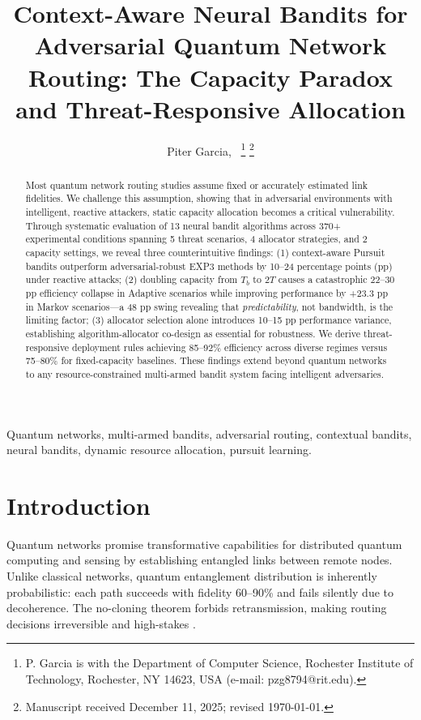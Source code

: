 \documentclass[10pt,twocolumn,journal]{IEEEtran}
\title{Context-Aware Neural Bandits for Adversarial Quantum Network Routing: The Capacity Paradox and Threat-Responsive Allocation}
\author{Piter Garcia,~\IEEEmembership{Student Member, IEEE}
\thanks{P. Garcia is with the Department of Computer Science, Rochester Institute of Technology, Rochester, NY 14623, USA (e-mail: pzg8794@rit.edu).}
\thanks{Manuscript received December 11, 2025; revised \today.}}
\begin{document}
\maketitle

\begin{abstract}

Most quantum network routing studies assume fixed or accurately estimated link fidelities. We challenge this assumption, showing that in adversarial environments with intelligent, reactive attackers, static capacity allocation becomes a critical vulnerability. Through systematic evaluation of 13 neural bandit algorithms across 370+ experimental conditions spanning 5 threat scenarios, 4 allocator strategies, and 2 capacity settings, we reveal three counterintuitive findings: (1) context-aware Pursuit bandits outperform adversarial-robust EXP3 methods by 10--24 percentage points (pp) under reactive attacks; (2) doubling capacity from $T_b$ to $2T$ causes a catastrophic 22--30 pp efficiency collapse in Adaptive scenarios while improving performance by +23.3 pp in Markov scenarios—a 48 pp swing revealing that \textit{predictability}, not bandwidth, is the limiting factor; (3) allocator selection alone introduces 10--15 pp performance variance, establishing algorithm-allocator co-design as essential for robustness. We derive threat-responsive deployment rules achieving 85--92\% efficiency across diverse regimes versus 75--80\% for fixed-capacity baselines. These findings extend beyond quantum networks to any resource-constrained multi-armed bandit system facing intelligent adversaries.

\end{abstract}

\begin{IEEEkeywords}
Quantum networks, multi-armed bandits, adversarial routing, contextual bandits, neural bandits, dynamic resource allocation, pursuit learning.
\end{IEEEkeywords}

\IEEEpeerreviewmaketitle

\section{Introduction}
\label{sec:introduction}

Q\lowercase{uantum} networks promise transformative capabilities for distributed quantum computing and sensing by establishing entangled links between remote nodes. Unlike classical networks, quantum entanglement distribution is inherently probabilistic: each path succeeds with fidelity 60--90\% and fails silently due to decoherence. The no-cloning theorem forbids retransmission, making routing decisions irreversible and high-stakes \cite{coopmans2021benchmark}.
\end{document}
